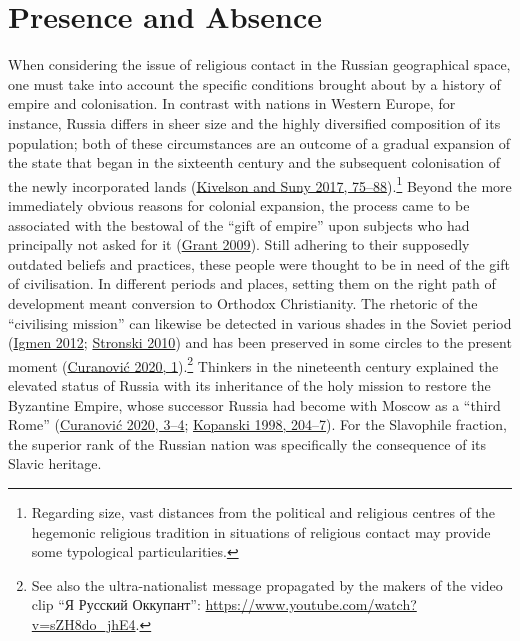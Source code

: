 \documentclass[
  english,
  a4paper,
  DIV=12,
  footlines=2.1,
  usegeometry=true]{scrartcl}
\newcommand{\textrussian}[2][]{\foreignlanguage{russian}{#2}}
\begin{document}
\hypertarget{presence-and-absence}{%
\section{Presence and Absence}\label{presence-and-absence}}

\leavevmode\marginpar{\textcolor{parnum}{{[}6{]}}}When considering the
issue of religious contact in the Russian geographical space, one must
take into account the specific conditions brought about by a history of
empire and colonisation. In contrast with nations in Western Europe, for
instance, Russia differs in sheer size and the highly diversified
composition of its population; both of these circumstances are an
outcome of a gradual expansion of the state that began in the sixteenth
century and the subsequent colonisation of the newly incorporated lands
(\protect\hyperlink{ref-kivelson_russia_2017}{Kivelson and Suny 2017,
75--88}).\footnote{Regarding size, vast distances from the political and
  religious centres of the hegemonic religious tradition in situations
  of religious contact may provide some typological particularities.}
Beyond the more immediately obvious reasons for colonial expansion, the
process came to be associated with the bestowal of the ``gift of
empire'' upon subjects who had principally not asked for it
(\protect\hyperlink{ref-grant_captive_2009}{Grant 2009}). Still adhering
to their supposedly outdated beliefs and practices, these people were
thought to be in need of the gift of civilisation. In different periods
and places, setting them on the right path of development meant
conversion to Orthodox Christianity. The rhetoric of the ``civilising
mission'' can likewise be detected in various shades in the Soviet
period (\protect\hyperlink{ref-igmen_speaking_2012}{Igmen 2012};
\protect\hyperlink{ref-stronski_tashkent_2010}{Stronski 2010}) and has
been preserved in some circles to the present moment
(\protect\hyperlink{ref-curanovic_guarding_2020}{Curanović 2020,
1}).\footnote{See also the ultra-nationalist message propagated by the
  makers of the video clip ``\textrussian{Я Русский Оккупант}'':
  \url{https://www.youtube.com/watch?v=sZH8do_jhE4}.} Thinkers in the
nineteenth century explained the elevated status of Russia with its
inheritance of the holy mission to restore the Byzantine Empire, whose
successor Russia had become with Moscow as a ``third Rome''
(\protect\hyperlink{ref-curanovic_guarding_2020}{Curanović 2020, 3--4};
\protect\hyperlink{ref-kopanski_burden_1998}{Kopanski 1998, 204--7}).
For the Slavophile fraction, the superior rank of the Russian nation was
specifically the consequence of its Slavic heritage.
\end{document}
